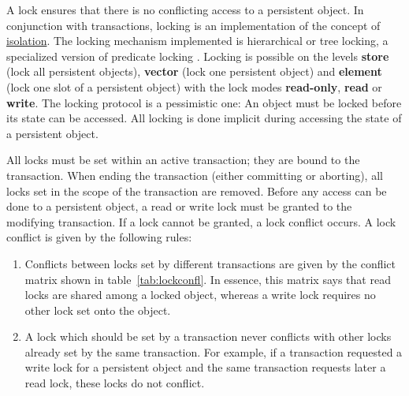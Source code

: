 A lock ensures that there is no conflicting access to a persistent
object. In conjunction with transactions, locking is an implementation
of the concept of \hyperlink{link:Isolation}{isolation}.  The locking
mechanism implemented is hierarchical or tree locking, a specialized
version of predicate locking \cite[]{bib:Gray-et-al-93}.
Locking is possible on the levels \textbf{store} (lock all persistent
objects), \textbf{vector} (lock one persistent object) and
\textbf{element} (lock one slot of a persistent object) with the lock
modes \textbf{read-only}, \textbf{read} or \textbf{write}. The locking
protocol is a pessimistic one: An object must be locked before its
state can be accessed. All locking is done implicit during accessing
the state of a persistent object.

All locks must be set within an active transaction; they are bound to
the transaction. When ending the transaction (either committing or
aborting), all locks set in the scope of the transaction are removed.
Before any access can be done to a persistent object, a read or write
lock must be granted to the modifying transaction. If a lock cannot be
granted, a lock conflict occurs. A lock conflict is given by the
following rules:

\begin{enumerate}

\item Conflicts between locks set by different transactions are given
  by the conflict matrix shown in table~\ref{tab:lockconfl}. In
  essence, this matrix says that read locks are shared among a locked
  object, whereas a write lock requires no other lock set onto the
  object.

\item A lock which should be set by a transaction never conflicts with
  other locks already set by the same transaction. For example, if a
  transaction requested a write lock for a persistent object and the
  same transaction requests later a read lock, these locks do not
  conflict.

\end{enumerate}

